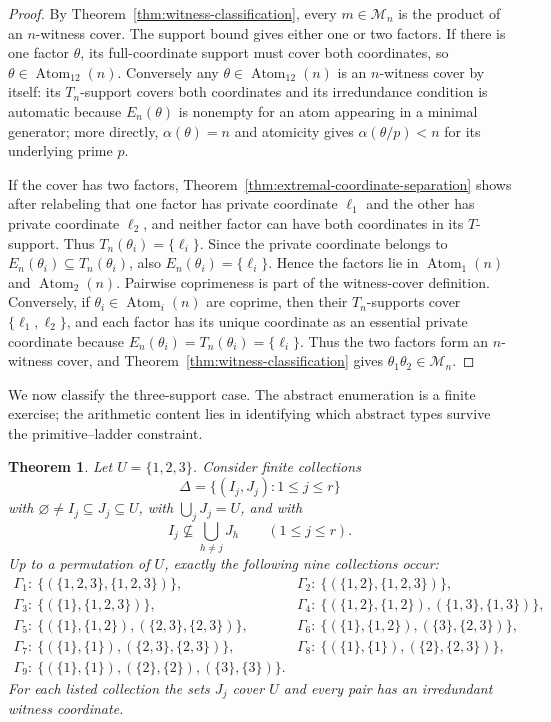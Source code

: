 \documentclass[11pt,letterpaper]{article}
\numberwithin{equation}{section}
\theoremstyle{plain}
\newtheorem{theorem}{Theorem}[section]
\theoremstyle{definition}
\theoremstyle{remark}
\DeclareMathOperator{\Atom}{Atom}
\begin{document}
\begin{proof}
By Theorem~\ref{thm:witness-classification}, every $m\in\mathcal M_n$ is the
product of an $n$-witness cover. The support bound gives either one or two
factors. If there is one factor $\theta$, its full-coordinate support must
cover both coordinates, so $\theta\in\Atom_{12}(n)$. Conversely any
$\theta\in\Atom_{12}(n)$ is an $n$-witness cover by itself: its $T_n$-support
covers both coordinates and its irredundance condition is automatic because
$E_n(\theta)$ is nonempty for an atom appearing in a minimal generator; more
directly, $\alpha(\theta)=n$ and atomicity gives
$\alpha(\theta/p)<n$ for its underlying prime $p$.

If the cover has two factors, Theorem~\ref{thm:extremal-coordinate-separation}
shows after relabeling that one factor has private coordinate $\ell_1$ and the
other has private coordinate $\ell_2$, and neither factor can have both
coordinates in its $T$-support. Thus
\(T_n(\theta_i)=\{\ell_i\}\). Since the private coordinate belongs to
\(E_n(\theta_i)\subseteq T_n(\theta_i)\), also
\(E_n(\theta_i)=\{\ell_i\}\). Hence the factors lie in
\(\Atom_1(n)\) and \(\Atom_2(n)\). Pairwise coprimeness is part of the
witness-cover definition.
Conversely, if $\theta_i\in\Atom_i(n)$ are coprime, then their
$T_n$-supports cover $\{\ell_1,\ell_2\}$, and each factor has its unique
coordinate as an essential private coordinate because
$E_n(\theta_i)=T_n(\theta_i)=\{\ell_i\}$. Thus the two factors form an
$n$-witness cover, and
Theorem~\ref{thm:witness-classification} gives
\(\theta_1\theta_2\in\mathcal M_n\).
\end{proof}

We now classify the three-support case. The abstract enumeration is a finite
exercise; the arithmetic content lies in identifying which abstract types
survive the primitive--ladder constraint.

\begin{theorem}\label{thm:abstract-three-types}
Let $U=\{1,2,3\}$. Consider finite collections
\[
\Delta=\{(I_j,J_j):1\le j\le r\}
\]
with $\varnothing\ne I_j\subseteq J_j\subseteq U$, with
\(\bigcup_jJ_j=U\), and with
\[
I_j\nsubseteq\bigcup_{h\ne j}J_h\qquad(1\le j\le r).
\]
Up to a permutation of $U$, exactly the following nine collections occur:
\[
\begin{array}{ll}
\Gamma_1:\ \{(\{1,2,3\},\{1,2,3\})\},&
\Gamma_2:\ \{(\{1,2\},\{1,2,3\})\},\\[2mm]
\Gamma_3:\ \{(\{1\},\{1,2,3\})\},&
\Gamma_4:\ \{(\{1,2\},\{1,2\}),(\{1,3\},\{1,3\})\},\\[2mm]
\Gamma_5:\ \{(\{1\},\{1,2\}),(\{2,3\},\{2,3\})\},&
\Gamma_6:\ \{(\{1\},\{1,2\}),(\{3\},\{2,3\})\},\\[2mm]
\Gamma_7:\ \{(\{1\},\{1\}),(\{2,3\},\{2,3\})\},&
\Gamma_8:\ \{(\{1\},\{1\}),(\{2\},\{2,3\})\},\\[2mm]
\Gamma_9:\ \{(\{1\},\{1\}),(\{2\},\{2\}),(\{3\},\{3\})\}.&
\end{array}
\]
For each listed collection the sets $J_j$ cover $U$ and every pair has an
irredundant witness coordinate.
\end{theorem}
\end{document}
